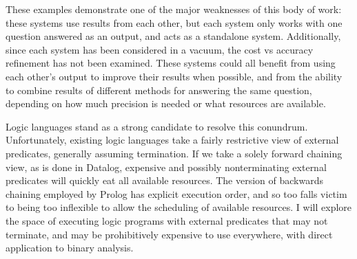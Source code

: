 These examples demonstrate one of the major weaknesses of this body of work: these systems use results from each other, but each system only works with one question answered as an output, and acts as a standalone system.
Additionally, since each system has been considered in a vacuum, the cost vs accuracy refinement has not been examined.
These systems could all benefit from using each other's output to improve their results when possible, and from the ability to combine results of different methods for answering the same question, depending on how much precision is needed or what resources are available.

Logic languages stand as a strong candidate to resolve this conundrum. Unfortunately, existing logic languages take a fairly restrictive view of external predicates, generally assuming termination. If we take a solely forward chaining view, as is done in Datalog, expensive and possibly nonterminating external predicates will quickly eat all available resources.
The version of backwards chaining employed by Prolog has explicit execution order, and so too falls victim to being too inflexible to allow the scheduling of available resources. I will explore the space of executing logic programs with external predicates that may not terminate, and may be prohibitively expensive to use everywhere, with direct application to binary analysis.

